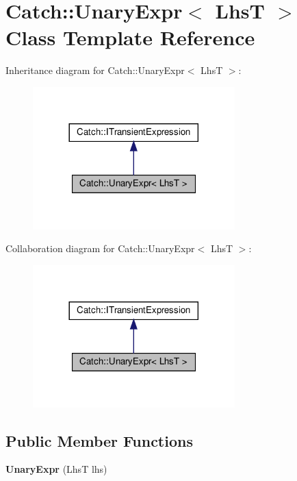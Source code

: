 \hypertarget{classCatch_1_1UnaryExpr}{}\section{Catch\+::Unary\+Expr$<$ LhsT $>$ Class Template Reference}
\label{classCatch_1_1UnaryExpr}


Inheritance diagram for Catch\+::Unary\+Expr$<$ LhsT $>$\+:
\nopagebreak
\begin{figure}[H]
\begin{center}
\leavevmode
\includegraphics[width=221pt]{classCatch_1_1UnaryExpr__inherit__graph}
\end{center}
\end{figure}


Collaboration diagram for Catch\+::Unary\+Expr$<$ LhsT $>$\+:
\nopagebreak
\begin{figure}[H]
\begin{center}
\leavevmode
\includegraphics[width=221pt]{classCatch_1_1UnaryExpr__coll__graph}
\end{center}
\end{figure}
\subsection*{Public Member Functions}
\begin{DoxyCompactItemize}
\item 
\mbox{\label{classCatch_1_1UnaryExpr_ae02f666a1e64da728628aa2033e1d6e7}} 
{\bfseries Unary\+Expr} (LhsT lhs)
\end{DoxyCompactItemize}
